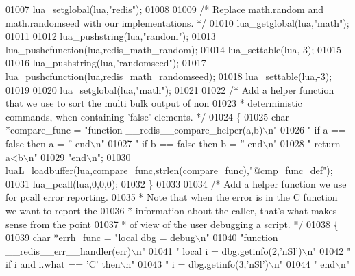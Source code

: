 \begin{DoxyCode}
{{{{{{{{01007     lua\_setglobal(lua,\textcolor{stringliteral}{"redis"});
01008 
01009     \textcolor{comment}{/* Replace math.random and math.randomseed with our implementations. */}
01010     lua\_getglobal(lua,\textcolor{stringliteral}{"math"});
01011 
01012     lua\_pushstring(lua,\textcolor{stringliteral}{"random"});
01013     lua\_pushcfunction(lua,redis\_math\_random);
01014     lua\_settable(lua,-3);
01015 
01016     lua\_pushstring(lua,\textcolor{stringliteral}{"randomseed"});
01017     lua\_pushcfunction(lua,redis\_math\_randomseed);
01018     lua\_settable(lua,-3);
01019 
01020     lua\_setglobal(lua,\textcolor{stringliteral}{"math"});
01021 
01022     \textcolor{comment}{/* Add a helper function that we use to sort the multi bulk output of non}
01023 \textcolor{comment}{     * deterministic commands, when containing 'false' elements. */}
01024     \{
01025         \textcolor{keywordtype}{char} *compare\_func =    \textcolor{stringliteral}{"function \_\_redis\_\_compare\_helper(a,b)\(\backslash\)n"}
01026                                 \textcolor{stringliteral}{"  if a == false then a = '' end\(\backslash\)n"}
01027                                 \textcolor{stringliteral}{"  if b == false then b = '' end\(\backslash\)n"}
01028                                 \textcolor{stringliteral}{"  return a<b\(\backslash\)n"}
01029                                 \textcolor{stringliteral}{"end\(\backslash\)n"};
01030         luaL\_loadbuffer(lua,compare\_func,strlen(compare\_func),\textcolor{stringliteral}{"@cmp\_func\_def"});
01031         lua\_pcall(lua,0,0,0);
01032     \}
01033 
01034     \textcolor{comment}{/* Add a helper function we use for pcall error reporting.}
01035 \textcolor{comment}{     * Note that when the error is in the C function we want to report the}
01036 \textcolor{comment}{     * information about the caller, that's what makes sense from the point}
01037 \textcolor{comment}{     * of view of the user debugging a script. */}
01038     \{
01039         \textcolor{keywordtype}{char} *errh\_func =       \textcolor{stringliteral}{"local dbg = debug\(\backslash\)n"}
01040                                 \textcolor{stringliteral}{"function \_\_redis\_\_err\_\_handler(err)\(\backslash\)n"}
01041                                 \textcolor{stringliteral}{"  local i = dbg.getinfo(2,'nSl')\(\backslash\)n"}
01042                                 \textcolor{stringliteral}{"  if i and i.what == 'C' then\(\backslash\)n"}
01043                                 \textcolor{stringliteral}{"    i = dbg.getinfo(3,'nSl')\(\backslash\)n"}
01044                                 \textcolor{stringliteral}{"  end\(\backslash\)n"}
}}}}}}}}
\end{DoxyCode}
